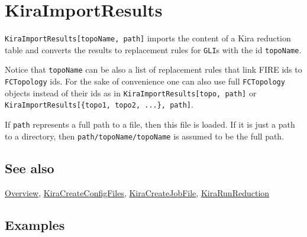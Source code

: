 \documentclass[../FeynHelpersManual.tex]{subfiles}
\begin{document}
\begin{Shaded}
\begin{Highlighting}[]
 
\end{Highlighting}
\end{Shaded}

\hypertarget{kiraimportresults}{
\section{KiraImportResults}\label{kiraimportresults}}

\texttt{KiraImportResults[\allowbreak{}topoName,\ \allowbreak{}path]}
imports the content of a Kira reduction table and converts the results
to replacement rules for \texttt{GLI}s with the id \texttt{topoName}.

Notice that \texttt{topoName} can be also a list of replacement rules
that link FIRE ids to \texttt{FCTopology} ids. For the sake of
convenience one can also use full \texttt{FCTopology} objects instead of
their ids as in
\texttt{KiraImportResults[\allowbreak{}topo,\ \allowbreak{}path]} or
\texttt{KiraImportResults[\allowbreak{}\{\allowbreak{}topo1,\ \allowbreak{}topo2,\ \allowbreak{}...\},\ \allowbreak{}path]}.

If \texttt{path} represents a full path to a file, then this file is
loaded. If it is just a path to a directory, then
\texttt{path/topoName/topoName} is assumed to be the full path.

\subsection{See also}

\hyperlink{toc}{Overview},
\hyperlink{kiracreateconfigfiles}{KiraCreateConfigFiles},
\hyperlink{kiracreatejobfile}{KiraCreateJobFile},
\hyperlink{kirarunreduction}{KiraRunReduction}

\subsection{Examples}

\begin{Shaded}
\begin{Highlighting}[]
\ExtensionTok{=} \OperatorTok{[\{}\OperatorTok{,} \OperatorTok{,} \OperatorTok{,} \OperatorTok{\}]}\NormalTok{;}
\end{Highlighting}
\end{Shaded}
\end{document}
